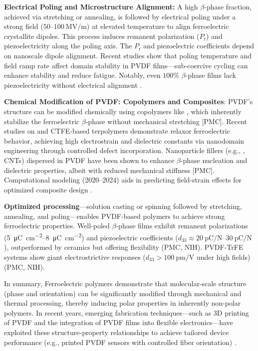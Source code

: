 \documentclass[a4paper,fleqn]{cas-sc}
\begin{document}
\par \textbf{Electrical Poling and Microstructure Alignment:} A high $\beta$-phase fraction, achieved via stretching or annealing, is followed by electrical poling under a strong field ($50$--$100~\mathrm{MV/m}$) at elevated temperature to align ferroelectric crystallite dipoles. This process induces remanent polarization ($P_\mathrm{r}$) and piezoelectricity along the poling axis. The $P_\mathrm{r}$ and piezoelectric coefficients depend on nanoscale dipole alignment. Recent studies show that poling temperature and field ramp rate affect domain stability in PVDF films---sub-coercive cycling can enhance stability and reduce fatigue. Notably, even $100\%$ $\beta$-phase films lack piezoelectricity without electrical alignment \cite{ahbab2025comprehensive}.

\par \textbf{Chemical Modification of PVDF: Copolymers and Composites}: PVDF's structure can be modified chemically using copolymers like , which inherently stabilize the ferroelectric $\beta$-phase without mechanical stretching [PMC]. Recent studies on  and CTFE-based terpolymers demonstrate relaxor ferroelectric behavior, achieving high electrostrain and dielectric constants via nanodomain engineering through controlled defect incorporation. Nanoparticle fillers (e.g., , CNTs) dispersed in PVDF have been shown to enhance $\beta$-phase nucleation and dielectric properties, albeit with reduced mechanical stiffness [PMC]. Computational modeling (2020--2024) aids in predicting field-strain effects for optimized composite design \cite{ahbab2025comprehensive}.

\par \textbf{Optimized processing}---solution casting or spinning followed by stretching, annealing, and poling---enables PVDF-based polymers to achieve strong ferroelectric properties. Well-poled $\beta$-phase films exhibit remanent polarizations (\SIrange{5}{8}{\micro\coulomb\per\square\centi\meter}) and piezoelectric coefficients ($d_{33} \approx \SIrange{20}{30}{\pico\coulomb\per\newton}$), outperformed by ceramics but offering flexibility (PMC, NIH). PVDF-TrFE systems show giant electrostrictive responses ($d_{33} > \SI{100}{\pico\meter\per\volt}$ under high fields) (PMC, NIH)\cite{ahbab2025comprehensive}.

\par In summary, Ferroelectric polymers demonstrate that molecular-scale structure (phase and orientation) can be significantly modified through mechanical and thermal processing, thereby inducing polar properties in inherently non-polar polymers. In recent years, emerging fabrication techniques—such as 3D printing of PVDF and the integration of PVDF films into flexible electronics—have exploited these structure-property relationships to achieve tailored device performance (e.g., printed PVDF sensors with controlled fiber orientation) \cite{ahbab2025comprehensive}.
\end{document}
